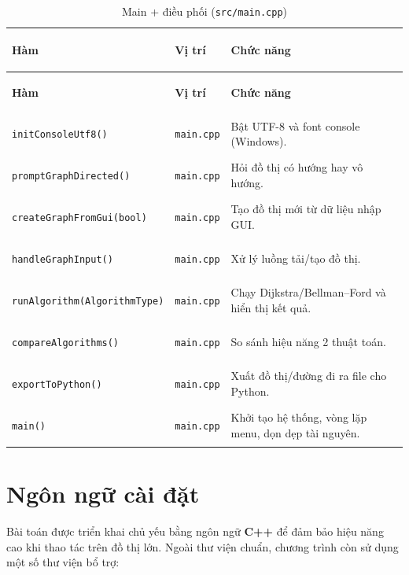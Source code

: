 \documentclass[14pt,a4paper]{report}
\begin{document}
\begin{longtable}{|>{\bfseries\raggedright\arraybackslash}p{}|
                   >{\bfseries\raggedright\arraybackslash}p{2.8cm}|
                   >{\raggedright\arraybackslash}p{}|}
\caption{Main + điều phối (\texttt{src/main.cpp})}\\
\hline
\rowcolor{headergray}
\color{white}\textbf{Hàm} & \color{white}\textbf{Vị trí} & \color{white}\textbf{Chức năng} \\
\hline
\endfirsthead

\hline
\rowcolor{headergray}
\color{white}\textbf{Hàm} & \color{white}\textbf{Vị trí} & \color{white}\textbf{Chức năng} \\
\hline
\endhead

\hline
\endfoot

\hline
\endlastfoot

\texttt{initConsoleUtf8()} & \texttt{main.cpp} & Bật UTF-8 và font console (Windows).\\ \hline
\texttt{promptGraphDirected()} & \texttt{main.cpp} & Hỏi đồ thị có hướng hay vô hướng.\\ \hline
\texttt{createGraphFromGui(bool)} & \texttt{main.cpp} & Tạo đồ thị mới từ dữ liệu nhập GUI.\\ \hline
\texttt{handleGraphInput()} & \texttt{main.cpp} & Xử lý luồng tải/tạo đồ thị.\\ \hline
\texttt{runAlgorithm(AlgorithmType)} & \texttt{main.cpp} & Chạy Dijkstra/Bellman--Ford và hiển thị kết quả.\\ \hline
\texttt{compareAlgorithms()} & \texttt{main.cpp} & So sánh hiệu năng 2 thuật toán.\\ \hline
\texttt{exportToPython()} & \texttt{main.cpp} & Xuất đồ thị/đường đi ra file cho Python.\\ \hline
\texttt{main()} & \texttt{main.cpp} & Khởi tạo hệ thống, vòng lặp menu, dọn dẹp tài nguyên.\\ \hline

\end{longtable}




\section{Ngôn ngữ cài đặt}
Bài toán được triển khai chủ yếu bằng ngôn ngữ \textbf{C++} để đảm bảo hiệu năng cao khi thao tác trên đồ thị lớn. Ngoài thư viện chuẩn, chương trình còn sử dụng một số thư viện bổ trợ:
\end{document}
